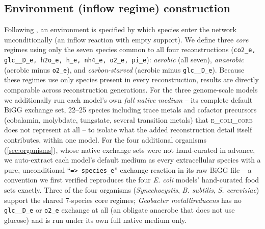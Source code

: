 \documentclass[nocrop]{bioinfo}
\begin{document}
\subsection{Environment (inflow regime) construction}
Following \citet{centler2006}, an environment is specified by which species enter the network
unconditionally (an inflow reaction with empty support). We define three \emph{core} regimes
using only the seven species common to all four reconstructions
(\texttt{co2\_e, glc\_\_D\_e, h2o\_e, h\_e, nh4\_e, o2\_e, pi\_e}): \emph{aerobic} (all seven),
\emph{anaerobic} (aerobic minus \texttt{o2\_e}), and \emph{carbon-starved} (aerobic minus
\texttt{glc\_\_D\_e}). Because these regimes use only species present in every reconstruction,
results are directly comparable across reconstruction generations. For the three genome-scale
models we additionally run each model's own \emph{full native medium} -- its complete default
BiGG exchange set, 22--25 species including trace metals and cofactor precursors
(cobalamin, molybdate, tungstate, several transition metals) that \textsc{e\_coli\_core} does
not represent at all -- to isolate what the added reconstruction detail itself contributes,
within one model. For the four additional organisms (\cref{sec:organisms}), whose native
exchange sets were not hand-curated in advance, we auto-extract each model's default medium as
every extracellular species with a pure, unconditional ``\texttt{=> species\_e}'' exchange
reaction in its raw BiGG file -- a convention we first verified reproduces the four
\textit{E. coli} models' hand-curated food sets exactly. Three of the four organisms
(\textit{Synechocystis}, \textit{B. subtilis}, \textit{S. cerevisiae}) support the shared
7-species core regimes; \textit{Geobacter metallireducens} has no \texttt{glc\_\_D\_e} or
\texttt{o2\_e} exchange at all (an obligate anaerobe that does not use glucose) and is run
under its own full native medium only.
\end{document}
